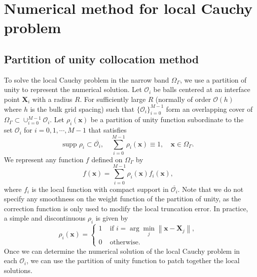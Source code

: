 \documentclass[preprint,11pt]{elsarticle}
\theoremstyle{remark}
\newcommand{\mc}[1]{\mathcal{#1}}
\newcommand{\bm}[1]{\boldsymbol{#1}}
\newcommand{\norm}[1]{\left\lVert #1 \right\rVert}
\begin{document}
\section{Numerical method for local Cauchy problem}\label{sec5}
\subsection{Partition of unity collocation method}
To solve the local Cauchy problem in the narrow band $\Omega_\Gamma$, we use a partition of unity to represent the numerical solution.
Let $\mc O_i$ be balls centered at an interface point $\bm X_i$ with a radius $R$. For sufficiently large $R$ (normally of order $\mc O(h)$ where $h$ is the bulk grid spacing) such that $\{\mc O_i\}_{i=0}^{M-1}$ form an overlapping cover of $\Omega_\Gamma \subset \cup_{i=0}^{M-1}\mc O_i$.
Let $\rho_i(\bm x)$ be a partition of unity function subordinate to the set $\mc O_i$ for $i=0,1,\cdots, M-1$ that satisfies
\begin{equation}
    \text{supp }\rho_i \subset \overline{\mc O_i}, \quad \sum_{i=0}^{M-1} \rho_i (\bm x) \equiv 1,\quad \bm x\in\Omega_\Gamma.
\end{equation}
We represent any function $f$ defined on $\Omega_\Gamma$ by
\begin{equation}
     f(\bm x) = \sum_{i = 0}^{M - 1} \rho_i(\bm x) f_i(\bm x),
\end{equation}
where $f_i$ is the local function with compact support in $\overline{\mc O_i}$.
Note that we do not specify any smoothness on the weight function of the partition of unity, as the correction function is only used to modify the local truncation error. In practice, a simple and discontinuous $\rho_i$ is given by
\begin{equation}
    \rho_i(\bm x) = 
    \begin{cases}
        1 & \text{ if } i = \arg\min_j\norm{\bm x - \bm X_j}, \\
        0 & \text{ otherwise}.
    \end{cases}
\end{equation}
Once we can determine the numerical solution of the local Cauchy problem in each $\mc O_i$, we can use the partition of unity function to patch together the local solutions.
\end{document}
